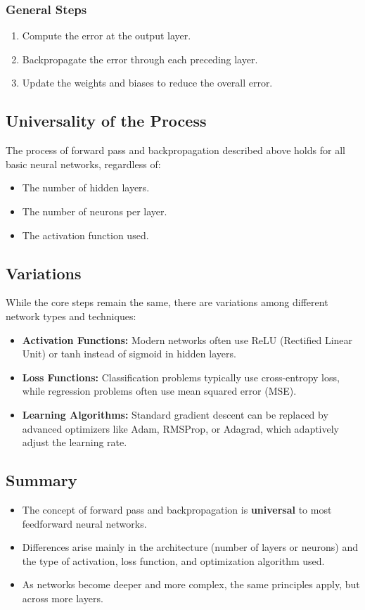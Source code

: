 \documentclass[11pt]{article}
\begin{document}
\subsubsection*{General Steps}
\begin{enumerate}
    \item Compute the error at the output layer.
    \item Backpropagate the error through each preceding layer.
    \item Update the weights and biases to reduce the overall error.
\end{enumerate}

\subsection{Universality of the Process}
\noindent The process of forward pass and backpropagation described above holds for all basic neural networks, regardless of:
\begin{itemize}
    \item The number of hidden layers.
    \item The number of neurons per layer.
    \item The activation function used.
\end{itemize}

\subsection{Variations}
While the core steps remain the same, there are variations among different network types and techniques:
\begin{itemize}
    \item \textbf{Activation Functions:} Modern networks often use ReLU (Rectified Linear Unit) or tanh instead of sigmoid in hidden layers.
    \item \textbf{Loss Functions:} Classification problems typically use cross-entropy loss, while regression problems often use mean squared error (MSE).
    \item \textbf{Learning Algorithms:} Standard gradient descent can be replaced by advanced optimizers like Adam, RMSProp, or Adagrad, which adaptively adjust the learning rate.
\end{itemize}

\subsection{Summary}
\begin{itemize}
    \item The concept of forward pass and backpropagation is \textbf{universal} to most feedforward neural networks.
    \item Differences arise mainly in the architecture (number of layers or neurons) and the type of activation, loss function, and optimization algorithm used.
    \item As networks become deeper and more complex, the same principles apply, but across more layers.
\end{itemize}
\end{document}
